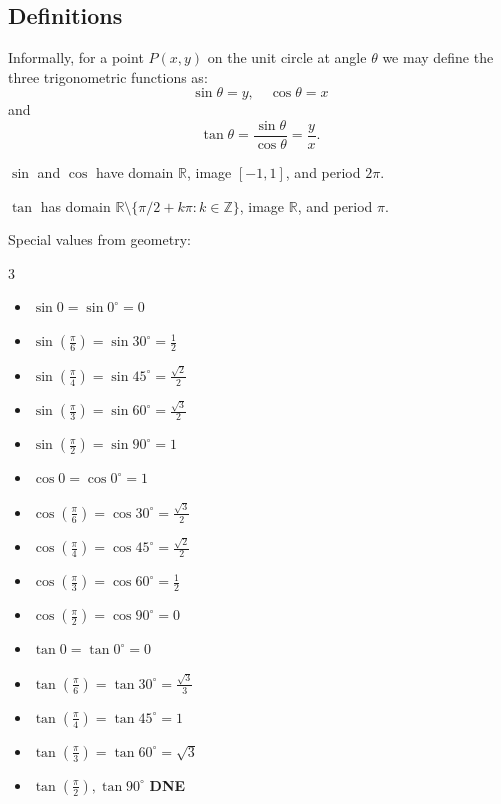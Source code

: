\documentclass[11pt]{article}
\theoremstyle{definition}
\theoremstyle{remark}
\newcommand{\pqty}[1]{\left(#1\right)}
\newcommand{\flatfrac}[2]{\frac{#1}{#2}}
\newcommand{\ccintv}[2]{[#1,#2]}
\newcommand{\ZZ}{\mathbb{Z}}
\newcommand{\RR}{\mathbb{R}}
\newcommand{\degree}{^{\circ}}
\begin{document}
\subsection{Definitions}\label{tmua-2-subsection-005}

Informally, for a point \(P\pqty{x, y}\) on the unit circle at angle \(\theta\) we may define the three trigonometric functions as:
\[
    \sin \theta = y, \quad \cos \theta = x
\]
and
\[
    \tan \theta = \frac{\sin \theta}{\cos \theta} = \frac{y}{x}.
\]

\(\sin\) and \(\cos\) have domain \(\RR\), image \(\ccintv{-1}{1}\), and period \(2 \pi\).

\(\tan\) has domain \(\RR\setminus\{\pi/2+k\pi:k\in\ZZ\}\), image \(\RR\), and period \(\pi\).

Special values from geometry:
\begin{multicols}{3}
    \begin{itemize}
        \item \(\sin 0 = \sin 0 \degree = 0\)
        \item \(\sin \pqty{\flatfrac{\pi}{6}} = \sin 30 \degree = \flatfrac{1}{2}\)
        \item \(\sin \pqty{\flatfrac{\pi}{4}} = \sin 45 \degree = \flatfrac{\sqrt{2}}{2}\)
        \item \(\sin \pqty{\flatfrac{\pi}{3}} = \sin 60 \degree = \flatfrac{\sqrt{3}}{2}\)
        \item \(\sin \pqty{\flatfrac{\pi}{2}} = \sin 90 \degree = 1\)
        \item \(\cos 0 = \cos 0 \degree = 1\)
        \item \(\cos \pqty{\flatfrac{\pi}{6}} = \cos 30 \degree = \flatfrac{\sqrt{3}}{2}\)
        \item \(\cos \pqty{\flatfrac{\pi}{4}} = \cos 45 \degree = \flatfrac{\sqrt{2}}{2}\)
        \item \(\cos \pqty{\flatfrac{\pi}{3}} = \cos 60 \degree = \flatfrac{1}{2}\)
        \item \(\cos \pqty{\flatfrac{\pi}{2}} = \cos 90 \degree = 0\)
        \item \(\tan 0 = \tan 0 \degree = 0\)
        \item \(\tan \pqty{\flatfrac{\pi}{6}} = \tan 30 \degree = \flatfrac{\sqrt{3}}{3}\)
        \item \(\tan \pqty{\flatfrac{\pi}{4}} = \tan 45 \degree = 1\)
        \item \(\tan \pqty{\flatfrac{\pi}{3}} = \tan 60 \degree = \sqrt{3}\)
        \item \(\tan \pqty{\flatfrac{\pi}{2}}, \tan 90 \degree\) \textbf{DNE}
    \end{itemize}
\end{multicols}
\end{document}

